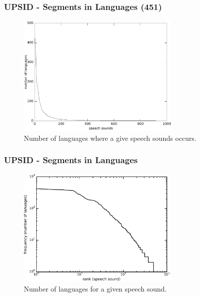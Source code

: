 \documentclass[notes]{beamer}
\begin{document}
\frame
{
  \frametitle{UPSID - Segments in Languages (451)}
  
  \begin{figure}[h!]
  \centering
  \includegraphics[width=0.7\textwidth]{images/occ_of_speech_sounds_plot.pdf}
  \caption{Number of languages where a give speech sounds occurs.}
  \label{fig:occ_of_speech_sounds_plot}
  \end{figure}
}

\frame
{
  \frametitle{UPSID - Segments in Languages}

  \begin{figure}[h!]
  \centering
  \includegraphics[width=0.7\textwidth]{images/occ_of_speech_sounds_plotlog.pdf}
  \caption{Number of languages for a given speech sound.}
  \label{fig:occ_of_speech_sounds_plotlog}
  \end{figure}
}
\end{document}
